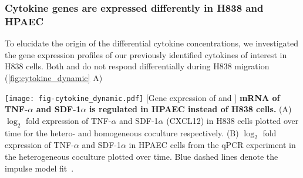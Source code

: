\subsubsection{Cytokine genes are expressed differently in H838 and HPAEC}

To elucidate the origin of the differential cytokine concentrations,
we investigated the gene expression profiles of
our previously identified cytokines of interest in H838 cells. 
Both \tnfa and \sdfonea do
not respond differentially during H838 migration (\ref{fig:cytokine_dynamic} A)

\begin{center}
\captionsetup{labelformat=prepage}
\texttt{[image: fig-cytokine\_dynamic.pdf]}
\newpage
[Gene expression of \tnfa and \sdfonea]{
{\bf mRNA of TNF-$\alpha$ and SDF-1$\alpha$ is regulated in HPAEC instead of H838 
cells.}
(A) $\log_2$ fold expression of TNF-$\alpha$ and SDF-1$\alpha$ (CXCL12) in H838 
cells plotted
over time for the hetero- and homogeneous coculture respectively.
(B) $\log_2$ fold expression of TNF-$\alpha$ and SDF-1$\alpha$ in HPAEC cells 
from the qPCR
experiment in the heterogeneous coculture plotted
over time. Blue dashed lines denote the impulse model fit~\cite{Chechik2009}.
}
\label{fig:cytokine_dynamic}
\end{center}


